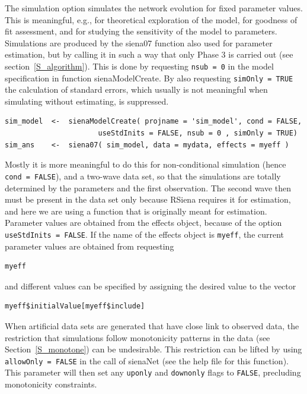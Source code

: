 \documentclass[a4paper,fleqn,11pt]{article}
\newcommand{\+}{\, + \,}
\newcommand{\sfn}[1]{\textsf{#1}}
\newcommand{\RS}{{\sf RSiena }}
\newcommand{\SI}{{\sf SIENA }}
\begin{document}
The simulation option simulates the network evolution for fixed
parameter values. This is meaningful, e.g., for theoretical
exploration of the model, for goodness of fit assessment,
and for studying the sensitivity of the model to parameters.
Simulations are produced by the \textsf{siena07} function
also used for parameter estimation, but by calling it in
such a way that only Phase 3 is carried out
(see section~\ref{S_algorithm}).
This is done by requesting \texttt{nsub = 0} in
the model specification in function \textsf{sienaModelCreate}.
By also requesting \texttt{simOnly = TRUE} the calculation
of standard errors, which usually is not meaningful when
simulating without estimating, is suppressed.
\begin{verbatim}
sim_model  <-  sienaModelCreate( projname = 'sim_model', cond = FALSE,
                      useStdInits = FALSE, nsub = 0 , simOnly = TRUE)
sim_ans    <-  siena07( sim_model, data = mydata, effects = myeff )
\end{verbatim}
Mostly it is more meaningful to do this for non-conditional simulation
(hence \texttt{cond = FALSE}), and a two-wave data set,
so that the simulations are totally determined
by the parameters and the first observation.
The second wave then must be present in the data set only
because \RS requires it for estimation,
and here we are using a function that is originally
meant for estimation.
Parameter values are obtained from the effects object,
because of the option \texttt{useStdInits = FALSE}.
If the name of the effects object is \texttt{myeff},
the current parameter values are obtained from requesting
\begin{verbatim}
myeff
\end{verbatim}
and different values can be specified by assigning the
desired value to the vector
\begin{verbatim}
myeff$initialValue[myeff$include]
\end{verbatim}

When artificial data sets are generated that have close link to observed data,
the restriction that simulations follow monotonicity patterns
in the data (see Section~\ref{S_monotone}) can be undesirable.
This restriction can be lifted by using \texttt{allowOnly = FALSE}
in the call of \sfn{sienaNet} (see the help file for this function).
This parameter will then set any \texttt{uponly} and \texttt{downonly}
flags to \texttt{FALSE}, precluding monotonicity constraints.

\end{document}
